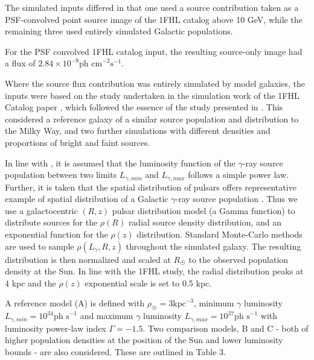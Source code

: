 \documentclass{PoS}
\begin{document}
The simulated inputs differed in that one used a source contribution taken as a PSF-convolved point source image of the 1FHL catalog above 10 GeV, while the remaining three used entirely simulated Galactic populations.

For the PSF convolved 1FHL catalog input, the resulting source-only image had a flux of $2.84\times 10^{-9} \text{ph cm}^{-2}\text{s}^{-1}$.

Where the source flux contribution was entirely simulated by model galaxies, the inputs were based on the study undertaken in the simulation work of the 1FHL Catalog paper \cite[p.59]{1fhl}, which followed the essence of the study presented in \cite{Strong}. This considered a reference galaxy of a similar source population and distribution to the Milky Way, and two further simulations with different densities and proportions of bright and faint sources.

In line with \cite{Strong}, it is assumed that the luminosity function of the $\gamma$-ray source population between two limits $L_{\gamma, min}$ and $L_{\gamma, max}$ follows a simple power law. Further, it is taken that the spatial distribution of pulsars offers representative example of spatial distribution of a Galactic $\gamma$-ray source population \cite[p.2]{Strong}. Thus we use a galactocentric $(R, z)$ pulsar distribution model \cite[p.7]{Lorimer} (a Gamma function) to distribute sources for the $\rho(R)$ radial source density distribution, and an exponential function for the $\rho(z)$ distribution. Standard Monte-Carlo methods are used to sample $\rho(L_{\gamma}, R, z)$ throughout the simulated galaxy. The resulting distribution is then normalized and scaled at $R_{\astrosun}$ to the observed population density at the Sun. In line with the 1FHL study, the radial distribution peaks at 4 kpc and the $\rho(z)$ exponential scale is set to 0.5 kpc.

A reference model (A) is defined with $\rho_{\astrosun} = 3 \text{kpc}^{-3}$, minimum $\gamma$ luminosity $L_{\gamma, min} = 10^{34} \text{ph s}^{-1}$ and maximum $\gamma$ luminosity $L_{\gamma, max} = 10^{37} \text{ph s}^{-1}$ with luminosity power-law index $\Gamma=-1.5$. Two comparison models, B and C - both of higher population densities at the position of the Sun and lower luminosity bounds - are also considered. These are outlined in Table 3.

\begin{table}
\centering
{}
\caption{Parameters for 10 - 500 GeV Galaxy Population Simulations.}
\end{table}
\end{document}
